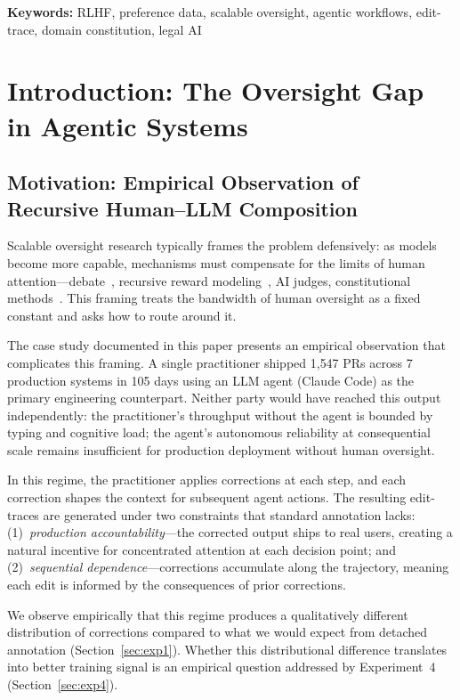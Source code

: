 \documentclass[11pt]{article}
\begin{document}
\vspace{0.5em}
\noindent\textbf{Keywords:} RLHF, preference data, scalable oversight, agentic workflows, edit-trace, domain constitution, legal AI

\section{Introduction: The Oversight Gap in Agentic Systems}
\label{sec:intro}

\subsection{Motivation: Empirical Observation of Recursive Human--LLM Composition}
\label{sec:motivation}

Scalable oversight research typically frames the problem defensively: as models become more capable, mechanisms must compensate for the limits of human attention---debate~\citep{irving2018ai}, recursive reward modeling~\citep{leike2018scalable}, AI judges, constitutional methods~\citep{christiano2017deep, bai2022constitutional}.
This framing treats the bandwidth of human oversight as a fixed constant and asks how to route around it.

The case study documented in this paper presents an empirical observation that complicates this framing.
A single practitioner shipped 1{,}547 PRs across 7 production systems in 105 days using an LLM agent (Claude Code) as the primary engineering counterpart.
Neither party would have reached this output independently: the practitioner's throughput without the agent is bounded by typing and cognitive load; the agent's autonomous reliability at consequential scale remains insufficient for production deployment without human oversight.

In this regime, the practitioner applies corrections at each step, and each correction shapes the context for subsequent agent actions.
The resulting edit-traces are generated under two constraints that standard annotation lacks:
(1)~\emph{production accountability}---the corrected output ships to real users, creating a natural incentive for concentrated attention at each decision point; and
(2)~\emph{sequential dependence}---corrections accumulate along the trajectory, meaning each edit is informed by the consequences of prior corrections.

We observe empirically that this regime produces a qualitatively different distribution of corrections compared to what we would expect from detached annotation (Section~\ref{sec:exp1}).
Whether this distributional difference translates into better training signal is an empirical question addressed by Experiment~4 (Section~\ref{sec:exp4}).
\end{document}
